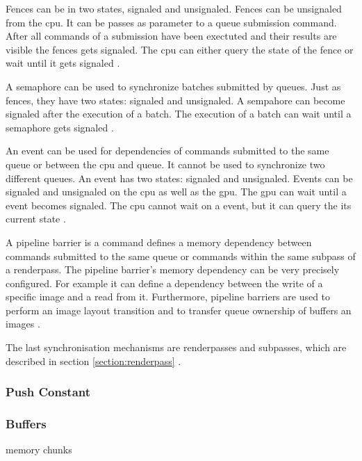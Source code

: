 Fences can be in two states, signaled and unsignaled. Fences can be unsignaled from the \gls{cpu}. It can be passes as parameter to a queue submission command. After all commands of a submission have been exectuted and their results are visible the fences gets signaled. The \gls{cpu} can either query the state of the fence or wait until it gets signaled \cite{khronos:vulkan:spec1.1}.

A semaphore can be used to synchronize batches submitted by queues. Just as fences, they have two states: signaled and unsignaled. A sempahore can become signaled after the execution of a batch. The execution of a batch can wait until a semaphore gets signaled \cite{khronos:vulkan:spec1.1}.

An event can be used for dependencies of commands submitted to the same queue or between the \gls{cpu} and queue. It cannot be used to synchronize two different queues. An event has two states: signaled and unsignaled. Events can be signaled and unsignaled on the \gls{cpu} as well as the \gls{gpu}. The \gls{gpu} can wait until a event becomes signaled. The \gls{cpu} cannot wait on a event, but it can query the its current state \cite{khronos:vulkan:spec1.1}.

A pipeline barrier is a command defines a memory dependency between commands submitted to the same queue or commands within the same subpass of a renderpass. The pipeline barrier's memory dependency can be very precisely configured. For example it can define a dependency between the write of a specific image and a read from it. Furthermore, pipeline barriers are used to perform an image layout transition and to transfer queue ownership of buffers an images \cite{khronos:vulkan:spec1.1}.

The last synchronisation mechanisms are renderpasses and subpasses, which are described in section \ref{section:renderpass} \cite{khronos:vulkan:spec1.1}.

\subsubsection{Push Constant}



\subsubsection{Buffers}
memory chunks






